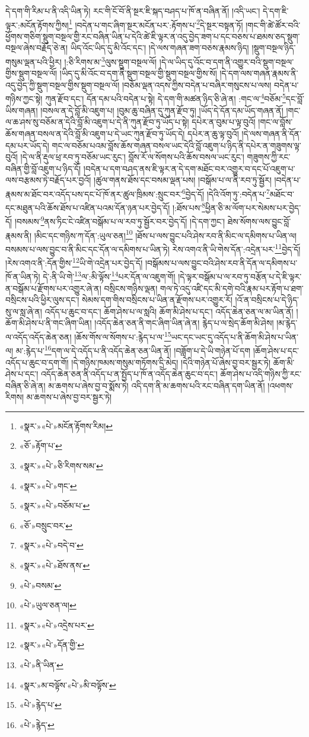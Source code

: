 དེ་དག་གི་རིམ་པ་ནི་འདི་ཡིན་ཏེ། རང་གི་ངོ་བོ་ནི་སྔར་ཇི་སྐད་བཤད་པ་ཁོ་ན་བཞིན་ནོ། །འདི་ཡང་། དེ་དག་ཇི་ལྟར་:མངོན་རྟོགས་ཀྱིས།\footnote{«སྣར་»«པེ་»མངོན་རྟོགས་རིམ།} །བདེན་པ་གང་ཞིག་སྔར་མངོན་པར་:རྟོགས་པ་\footnote{«ཅོ་»རྟོག་པ་}དེ་སྔར་བསྟན་ཏོ། །གང་གི་ཚེ་ཚོར་བའི་ཕྱོགས་གཅིག་སྡུག་བསྔལ་གྱི་རང་བཞིན་ཡིན་པ་དེའི་ཚེ་ཇི་ལྟར་ན་འདུ་བྱེད་ཟག་པ་དང་བཅས་པ་ཐམས་ཅད་སྡུག་བསྔལ་ཞེས་བརྗོད་ཅེ་ན། ཡིད་འོང་ཡིད་དུ་མི་འོང་དང་། །དེ་ལས་གཞན་ཟག་བཅས་རྣམས་ཉིད། །སྡུག་བསྔལ་ཉིད་གསུམ་ལྡན་པའི་ཕྱིར། །:ཅི་རིགས་མ་\footnote{«སྣར་»«པེ་»ཅི་རིགས་སམ་}ལུས་སྡུག་བསྔལ་ལོ། །དེ་ལ་ཡིད་དུ་འོང་བ་དག་ནི་འགྱུར་བའི་སྡུག་བསྔལ་གྱིས་སྡུག་བསྔལ་ལོ། །ཡིད་དུ་མི་འོང་བ་དག་ནི་སྡུག་བསྔལ་གྱི་སྡུག་བསྔལ་གྱིས་སོ། །དེ་དག་ལས་གཞན་རྣམས་ནི་འདུ་བྱེད་ཀྱི་སྡུག་བསྔལ་གྱིས་སྡུག་བསྔལ་ལོ། །བཅོམ་ལྡན་འདས་ཀྱིས་བདེན་པ་བཞིར་གསུངས་པ་ལས། བདེན་པ་གཉིས་ཀྱང་སྟེ། ཀུན་རྫོབ་དང་། དོན་དམ་པའི་བདེན་པ་སྟེ། དེ་དག་གི་མཚན་ཉིད་ཅི་ཞེ་ན། :གང་ལ་\footnote{«སྣར་»«པེ་»གང་}བཅོམ་\footnote{«སྣར་»«པེ་»བཅོམ་པ་}དང་བློ་ཡིས་གཞན། །བསལ་ན་དེ་བློ་མི་འཇུག་པ། །བུམ་ཆུ་བཞིན་དུ་ཀུན་རྫོབ་ཏུ། །ཡོད་དེ་དོན་དམ་ཡོད་གཞན་ནོ། །གང་ལ་ཆ་ཤས་སུ་བཅོམ་ན་དེའི་བློ་མི་འཇུག་པ་དེ་ནི་ཀུན་རྫོབ་ཏུ་ཡོད་པ་སྟེ། དཔེར་ན་བུམ་པ་ལྟ་བུའོ། །གང་ལ་བློས་ཆོས་གཞན་བསལ་ན་དེའི་བློ་མི་འཇུག་པ་དེ་ཡང་ཀུན་རྫོབ་ཏུ་ཡོད་དེ། དཔེར་ན་ཆུ་ལྟ་བུའོ། །དེ་ལས་གཞན་ནི་དོན་དམ་པར་ཡོད་དེ། གང་ལ་བཅོམ་པའམ་བློས་ཆོས་གཞན་བསལ་ཡང་དེའི་བློ་འཇུག་པ་ཉིད་ནི་དཔེར་ན་གཟུགས་ལྟ་བུའོ། །དེ་ལ་ནི་རྡུལ་ཕྲ་རབ་ཏུ་བཅོམ་ཡང་རུང་། བློས་རོ་ལ་སོགས་པའི་ཆོས་བསལ་ཡང་རུང་། གཟུགས་ཀྱི་རང་བཞིན་གྱི་བློ་འཇུག་པ་ཉིད་དོ། །བདེན་པ་དག་བཤད་ནས་ཇི་ལྟར་ན་དེ་དག་མཐོང་བར་འགྱུར་བ་དང་པོ་འཇུག་པ་ལས་བརྩམས་ཏེ་བརྗོད་པར་བྱའོ། །ཚུལ་གནས་ཐོས་དང་བསམ་ལྡན་པས། །བསྒོམ་པ་ལ་ནི་རབ་ཏུ་སྦྱོར། །བདེན་པ་རྣམས་མ་ཐོང་བར་འདོད་པས་དང་པོ་ཁོ་ནར་ཚུལ་ཁྲིམས་:སྲུང་བར་\footnote{«ཅོ་»བསྲུང་བར་}བྱེད་དོ། །དེའི་འོག་ཏུ་:བདེན་པ་\footnote{«སྣར་»«པེ་»བདེ་བ་}མཐོང་བ་དང་མཐུན་པའི་ཆོས་ཐོས་པ་འཛིན་པའམ་དོན་ཉན་པར་བྱེད་དོ། །:ཐོས་པས་\footnote{«སྣར་»«པེ་»ཐོས་ནས་}ཕྱིན་ཅི་མ་ལོག་པར་སེམས་པར་བྱེད་དོ། །བསམས་\footnote{«པེ་»བསམ་}ནས་ཏིང་ངེ་འཛིན་བསྒོམ་པ་ལ་རབ་ཏུ་སྦྱོར་བར་བྱེད་དོ། །དེ་དག་ཀྱང་། ཐེས་སོགས་ལས་བྱུང་བློ་རྣམས་ནི། །མིང་དང་གཉིས་ཀ་དོན་:ཡུལ་ཅན།\footnote{«པེ་»ཡུལ་ཅན་ལ།} །ཐོས་པ་ལས་བྱུང་པའི་ཤེས་རབ་ནི་མིང་ལ་དམིགས་པ་ཡིན་ལ། བསམས་པ་ལས་བྱུང་བ་ནི་མིང་དང་དོན་ལ་དམིགས་པ་ཡིན་ཏེ། རེས་འགའ་ནི་ཡི་གེས་དོན་:འདྲེན་པར་\footnote{«སྣར་»«པེ་»འདྲེས་པར་}བྱེད་དོ། །རེས་འགའ་ནི་:དོན་གྱིས་\footnote{«སྣར་»«པེ་»དོན་གྱི་}ཡི་གེ་འདྲེན་པར་བྱེད་དོ། །བསྒོམས་པ་ལས་བྱུང་བའི་ཤེས་རབ་ནི་དོན་ལ་དམིགས་པ་ཁོ་ན་ཡིན་ཏེ། དེ་:ནི་ཡི་གེ་\footnote{«པེ་»ནི་ཡིན་}ལ་:མི་ལྟོས་\footnote{«སྣར་»མ་བལྟོས་«པེ་»མི་བལྟོས་}པར་དོན་ལ་འཇུག་གོ། །དེ་ལྟར་བསྒོམ་པ་ལ་རབ་ཏུ་བརྩོན་པ་དེ་ཇི་ལྟར་ན་བསྒོམ་པ་རྫོགས་པར་འགྱུར་ཞེ་ན། བསྲིངས་གཉིས་ལྡན། གལ་ཏེ་འདུ་འཛི་དང་མི་དགེ་བའི་རྣམ་པར་རྟོག་པ་ཐག་བསྲིངས་པའི་ཕྱིར་ལུས་དང་། སེམས་དག་གིས་བསྲིངས་པ་ཡིན་ན་རྫོགས་པར་འགྱུར་རོ། །འོ་ན་བསྲིངས་པ་དེ་ཉིད་སུ་ལ་སླ་ཞེ་ན། འདོད་པ་ཆུང་བ་དང་། ཆོག་ཤེས་པ་ལ་སླའི། ཆོག་མི་ཤེས་པ་དང་། འདོད་ཆེན་ཅན་ལ་མ་ཡིན་ནོ། །ཆོག་མི་ཤེས་པ་ནི་གང་ཞིག་ཡིན། །འདོད་ཆེན་ཅན་ནི་གང་ཞིག་ཡིན་ཞེ་ན། རྙེད་པ་ལ་སྲེད་ཆོག་མི་ཤེས། །མ་རྙེད་ལ་འདོད་འདོད་ཆེན་ཅན། །ཆོས་གོས་ལ་སོགས་པ་:རྙེད་པ་ལ་\footnote{«པེ་»རྙེད་པ་}ཡང་དང་ཡང་དུ་འདོད་པ་ནི་ཆོག་མི་ཤེས་པ་ཡིན་ལ། མ་:རྙེད་པ་\footnote{«པེ་»རྙེད་}དག་ལ་དེ་འདོད་པ་ནི་འདོད་ཆེན་ཅན་ཡིན་ནོ། །བཟློག་པ་དེ་ཡི་གཉེན་པོ་དག །ཆོག་ཤེས་པ་དང་འདོད་པ་ཆུང་བ་དག་གོ། །དེ་གཉིས་ཁམས་གསུམ་གཏོགས་དྲི་མེད། །དེའི་གཉེན་པོ་ཞེས་བྱ་བར་སྦྱར་ཏེ། ཆོག་མི་ཤེས་པ་དང་། འདོད་ཆེན་ཅན་ནི་འདོད་པ་ན་སྤྱོད་པ་ཁོ་ན་འདོད་ཆེན་ཆུང་བ་དང་། ཆོག་ཤེས་པ་འདི་གཉིས་ཀྱི་རང་བཞིན་ཅི་ཞེ་ན། མ་ཆགས་པ་ཞེས་བྱ་བ་སྨོས་ཏེ། འདི་དག་ནི་མ་ཆགས་པའི་རང་བཞིན་དག་ཡིན་ནོ། །འཕགས་རིགས། མ་ཆགས་པ་ཞེས་བྱ་བར་སྦྱར་ཏེ། 